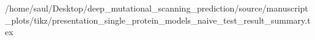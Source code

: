 /home/saul/Desktop/deep_mutational_scanning_prediction/source/manuscript_plots/tikz/presentation_single_protein_models_naive_test_result_summary.tex